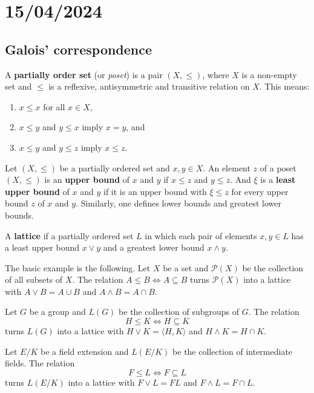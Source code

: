 \section{15/04/2024}

\subsection{Galois' correspondence}

A \textbf{partially order set} (or \emph{poset}) is a pair $(X,\leq)$, where $X$ is a non-empty set
and $\leq$ is a reflexive, antisymmetric and transitive relation on $X$. This means:
\begin{enumerate}
    \item $x\leq x$ for all $x\in X$, 
    \item $x\leq y$ and $y\leq x$ imply $x=y$, and 
    \item $x\leq y$ and $y\leq z$ imply $x\leq z$. 
\end{enumerate}
Let $(X,\leq)$ be a partially ordered set and $x,y\in X$. 
An element $z$ of a poset $(X,\leq)$ is an \textbf{upper bound} of $x$ and $y$ if 
$x\leq z$ and $y\leq z$. And $\xi$ 
is a \textbf{least upper bound} of $x$ and $y$ 
if it is an upper bound with $\xi\leq z$ for every upper bound $z$ of $x$ and $y$. 
Similarly, one defines lower bounds and greatest lower bounds. 

\begin{definition}
    A \textbf{lattice} if a partially ordered set $L$ in which 
    each pair of elements $x,y\in L$ has a least upper bound $x\vee y$ and a
    greatest lower bound $x\wedge y$. 
\end{definition}

The basic example is the following. 
Let $X$ be a set and $\mathcal{P}(X)$ be the collection of all subsets of $X$. The relation 
$A\leq B\Longleftrightarrow A\subseteq B$
turns $\mathcal{P}(X)$ into a lattice 
with $A\vee B=A\cup B$ and $A\wedge B=A\cap B$. 

\begin{example}
    Let $G$ be a group and $L(G)$ be the collection of subgroups of $G$. The relation
    \[ 
    H\leq K\Longleftrightarrow H\subseteq K
    \] 
    turns $L(G)$ into a lattice 
    with $H\vee K=\langle H,K\rangle$ and 
    $H\wedge K=H\cap K$. 
\end{example}

\begin{example}
    Let $E/K$ be a field extension and $L(E/K)$ be the collection of 
    intermediate fields. The relation
    \[
    F\leq L\Longleftrightarrow F\subseteq L
    \]
    turns $L(E/K)$ into a lattice with 
    $F\vee L=FL$ and $F\wedge L=F\cap L$. 
\end{example}

